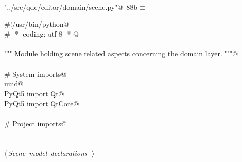 \documentclass[
    a4paper,      %
    10pt,         %
    openright,    %
    notitlepage,  %
    parskip=half, %
]{scrreprt}       %
\theoremstyle{definition}                    %
\begin{document}
\begin{flushleft} \small
\begin{minipage}{\linewidth}\label{scrap139}\raggedright\small
{} \verb@"../src/qde/editor/domain/scene.py"@\nobreak\ {\footnotesize {88b}}$\equiv$
\vspace{-1ex}
\begin{list}{}{} \item
\mbox{}\lstinline@#!/usr/bin/python@\\
\mbox{}\lstinline@# -*- coding: utf-8 -*-@\\
\mbox{}\lstinline@@\\
\mbox{}\lstinline@""" Module holding scene related aspects concerning the domain layer. """@\\
\mbox{}\lstinline@@\\
\mbox{}\lstinline@# System imports@\\
\mbox{}\lstinline@import uuid@\\
\mbox{}\lstinline@from PyQt5 import Qt@\\
\mbox{}\lstinline@from PyQt5 import QtCore@\\
\mbox{}\lstinline@@\\
\mbox{}\lstinline@# Project imports@\\
\mbox{}\lstinline@@\\
\mbox{}\lstinline@@\\
\mbox{}\lstinline@@\hbox{$\langle\,${\itshape Scene model declarations}\nobreak\ {\footnotesize {}}$\,\rangle$}\lstinline@@\\
\mbox{}\lstinline@@{\NWsep}
\end{list}
\vspace{-1.5ex}
\footnotesize
\begin{list}{}{\setlength{\itemsep}{-\parsep}\setlength{\itemindent}{-\leftmargin}}

\item{}
\end{list}
\end{minipage}\vspace{4ex}
\end{flushleft}
\end{document}
